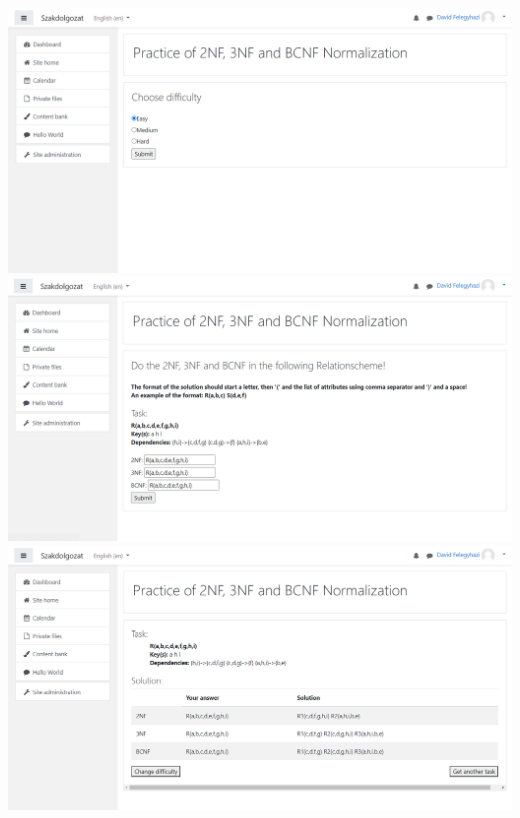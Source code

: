 \begin{center}
    \includegraphics[scale=0.4]{Fejezetek/Images/english01.png}
    \hfill \break
    \includegraphics[scale=0.4]{Fejezetek/Images/english02.png}
    \hfill \break
    \includegraphics[scale=0.4]{Fejezetek/Images/english03.png}
\end{center}